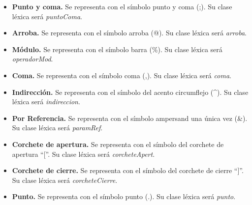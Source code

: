 \begin{itemize}
    \item \textbf{Punto y coma.} Se representa con el símbolo punto y coma (;). Su clase léxica será \textit{puntoComa}.
    \item \textbf{Arroba.} Se representa con el símbolo arroba (@). Su clase léxica será \textit{arroba}.
    \item \textbf{Módulo.} Se representa con el símbolo barra (\%). Su clase léxica será \textit{operadorMod}.
    \item \textbf{Coma.} Se representa con el símbolo coma (,). Su clase léxica será \textit{coma}.
    \item \textbf{Indirección.} Se representa con el símbolo del acento circumflejo (\^{}). Su clase léxica será \textit{indireccion}.
    \item \textbf{Por Referencia.} Se representa con el símbolo ampersand una única vez (\&). Su clase léxica será \textit{paramRef}.
    \item \textbf{Corchete de apertura.} Se representa con el símbolo del corchete de apertura ``[''. Su clase léxica será \textit{corcheteApert}.
    \item \textbf{Corchete de cierre.} Se representa con el símbolo del corchete de cierre ``]''. Su clase léxica será \textit{corcheteCierre}.
    \item \textbf{Punto.} Se representa con el símbolo punto (.). Su clase léxica será \textit{punto}.
\end{itemize}
